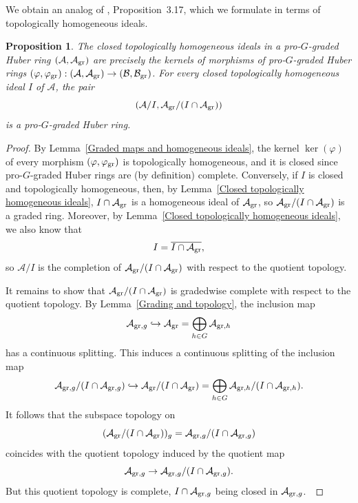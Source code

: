 \documentclass[12pt,twoside,a4paper]{article}
\newtheorem{prop}[thm]{Proposition}
\theoremstyle{definition}
\theoremstyle{remark}
\newcommand\gr{{\rm gr}}
\begin{document}
We obtain an analog of \cite{Ishizuka-Yoshikawa25}, Proposition~3.17, which we formulate in terms of topologically homogeneous ideals. 
\begin{prop}\label{Graded maps and homogeneous ideals 2}The closed topologically homogeneous ideals in a pro-$G$-graded Huber ring $(\mathcal{A}, \mathcal{A}_{\gr})$ are precisely the kernels of morphisms of pro-$G$-graded Huber rings $(\varphi, \varphi_{\gr}): (\mathcal{A}, \mathcal{A}_{\gr})\to (\mathcal{B}, \mathcal{B}_{\gr})$. For every closed topologically homogeneous ideal $I$ of $\mathcal{A}$, the pair \begin{equation*}(\mathcal{A}/I, \mathcal{A}_{\gr}/(I\cap \mathcal{A}_{\gr}))\end{equation*}is a pro-$G$-graded Huber ring.\end{prop}
\begin{proof}By Lemma~\ref{Graded maps and homogeneous ideals}, the kernel $\ker(\varphi)$ of every morphism $(\varphi, \varphi_{\gr}) $ is topologically homogeneous, and it is closed since pro-$G$-graded Huber rings are (by definition) complete. Conversely, if $I$ is closed and topologically homogeneous, then, by Lemma~\ref{Closed topologically homogeneous ideals}, $I\cap \mathcal{A}_{\gr}$ is a homogeneous ideal of $\mathcal{A}_{\gr}$, so $\mathcal{A}_{\gr}/(I\cap \mathcal{A}_{\gr})$ is a graded ring. Moreover, by Lemma~\ref{Closed topologically homogeneous ideals}, we also know that \begin{equation*}I=\overline{I\cap \mathcal{A}_{\gr}},\end{equation*}so $\mathcal{A}/I$ is the completion of $\mathcal{A}_{\gr}/(I\cap \mathcal{A}_{\gr})$ with respect to the quotient topology.

It remains to show that $\mathcal{A}_{\gr}/(I\cap \mathcal{A}_{\gr})$ is gradedwise complete with respect to the quotient topology. By Lemma~\ref{Grading and topology}, the inclusion map \begin{equation*}\mathcal{A}_{\gr, g}\hookrightarrow \mathcal{A}_{\gr}=\bigoplus_{h\in G}\mathcal{A}_{\gr, h}\end{equation*}has a continuous splitting. This induces a continuous splitting of the inclusion map \begin{equation*}\mathcal{A}_{\gr, g}/(I\cap \mathcal{A}_{\gr, g})\hookrightarrow \mathcal{A}_{\gr}/(I\cap \mathcal{A}_{\gr})=\bigoplus_{h\in G}\mathcal{A}_{\gr, h}/(I\cap \mathcal{A}_{\gr, h}).\end{equation*}It follows that the subspace topology on \begin{equation*}(\mathcal{A}_{\gr}/(I\cap \mathcal{A}_{\gr}))_{g}=\mathcal{A}_{\gr, g}/(I\cap \mathcal{A}_{\gr, g})\end{equation*}coincides with the quotient topology induced by the quotient map \begin{equation*}\mathcal{A}_{\gr, g}\to \mathcal{A}_{\gr, g}/(I\cap \mathcal{A}_{\gr, g}).\end{equation*}But this quotient topology is complete, $I\cap \mathcal{A}_{\gr, g}$ being closed in $\mathcal{A}_{\gr, g}$. \end{proof}
\end{document}
